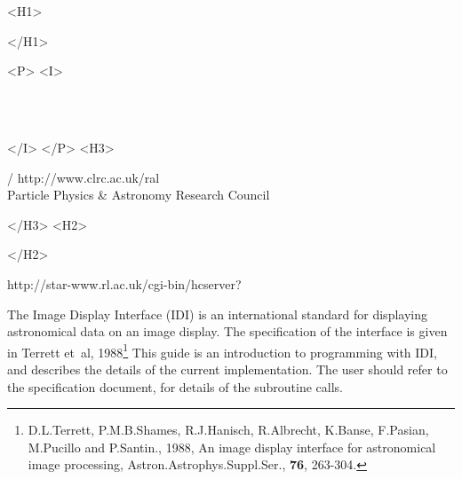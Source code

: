 \begin{htmlonly}
   \xlabel{}
   \begin{rawhtml} <H1> \end{rawhtml}
      \stardoctitle
   \begin{rawhtml} </H1> \end{rawhtml}


   \begin{rawhtml} <P> <I> \end{rawhtml}
   \stardoccategory\ \stardocnumber \\
   \stardocauthors \\
   \stardocdate
   \begin{rawhtml} </I> </P> <H3> \end{rawhtml}
       /
                        {http://www.clrc.ac.uk/ral} \\
      Particle Physics \& Astronomy Research Council \\
   \begin{rawhtml} </H3> <H2> \end{rawhtml}
   \begin{rawhtml} </H2> \end{rawhtml}
      {http://star-www.rl.ac.uk/cgi-bin/hcserver?\stardocsource}\\


\end{htmlonly}


The Image Display Interface (IDI) is an international standard for
displaying astronomical data on an image display. 
The specification of the interface is given in Terrett et~al, 
1988\footnote{D.L.Terrett, P.M.B.Shames, R.J.Hanisch, R.Albrecht,
K.Banse, F.Pasian, M.Pucillo and P.Santin., 1988, 
An image display interface for astronomical image processing, 
Astron.Astrophys.Suppl.Ser., {\bf 76}, 263-304.}
This guide is an introduction to
programming with IDI, and describes the details of the current implementation.
The user should refer to the specification document, for details of the
subroutine calls.

